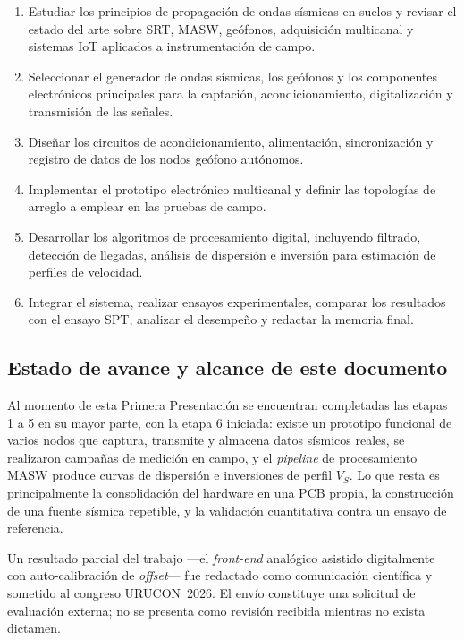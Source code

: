 \begin{enumerate}[itemsep=0.15em]
    \item Estudiar los principios de propagaci\'on de ondas s\'ismicas en suelos y revisar
    el estado del arte sobre SRT, MASW, ge\'ofonos, adquisici\'on multicanal y sistemas
    IoT aplicados a instrumentaci\'on de campo.
    \item Seleccionar el generador de ondas s\'ismicas, los ge\'ofonos y los componentes
    electr\'onicos principales para la captaci\'on, acondicionamiento, digitalizaci\'on y
    transmisi\'on de las se\~nales.
    \item Dise\~nar los circuitos de acondicionamiento, alimentaci\'on, sincronizaci\'on y
    registro de datos de los nodos ge\'ofono aut\'onomos.
    \item Implementar el prototipo electr\'onico multicanal y definir las topolog\'ias de
    arreglo a emplear en las pruebas de campo.
    \item Desarrollar los algoritmos de procesamiento digital, incluyendo filtrado,
    detecci\'on de llegadas, an\'alisis de dispersi\'on e inversi\'on para estimaci\'on de
    perfiles de velocidad.
    \item Integrar el sistema, realizar ensayos experimentales, comparar los resultados
    con el ensayo SPT, analizar el desempe\~no y redactar la memoria final.
\end{enumerate}

\subsection{Estado de avance y alcance de este documento}

Al momento de esta Primera Presentaci\'on se encuentran completadas las etapas 1 a 5 en
su mayor parte, con la etapa 6 iniciada: existe un prototipo funcional de varios nodos
que captura, transmite y almacena datos s\'ismicos reales, se realizaron campa\~nas de
medici\'on en campo, y el \emph{pipeline} de procesamiento MASW produce curvas de
dispersi\'on e inversiones de perfil $V_S$. Lo que resta es principalmente la
consolidaci\'on del hardware en una PCB propia, la construcci\'on de una fuente s\'ismica
repetible, y la validaci\'on cuantitativa contra un ensayo de referencia.

Un resultado parcial del trabajo ---el \emph{front-end} anal\'ogico asistido digitalmente
con auto-calibraci\'on de \emph{offset}--- fue redactado como comunicaci\'on cient\'ifica y
sometido al congreso URUCON~2026. El env\'io constituye una solicitud de evaluaci\'on
externa; no se presenta como revisi\'on recibida mientras no exista dictamen.

